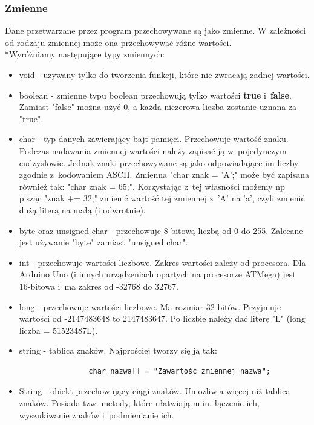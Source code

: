\documentclass[a4paper,12pt, twoside]{article}
\begin{document}
	\subsubsection{Zmienne}
		Dane przetwarzane przez program przechowywane są jako zmienne. W zależności od rodzaju zmiennej może ona przechowywać różne wartości.
		\\*Wyróżniamy następujące typy zmiennych:
		\begin{itemize}
			\item void - używany tylko do tworzenia funkcji, które nie zwracają żadnej wartości.
			\item boolean - zmienne typu boolean przechowują tylko wartości \textbf{true} i~\textbf{false}. Zamiast "false" można użyć $0$, a każda niezerowa liczba zostanie uznana za "true".
			\item char - typ danych zawierający bajt pamięci. Przechowuje wartość znaku.
				Podczas nadawania zmiennej wartości należy zapisać ją w~pojedynczym cudzysłowie.
				Jednak znaki przechowywane są jako odpowiadające im liczby zgodnie z~kodowaniem ASCII.
				Zmienna "char znak = 'A';" może być zapisana również tak: "char znak = 65;".
				Korzystając z~tej własności możemy np pisząc "znak += 32;" zmienić wartość tej zmiennej z~'A' na 'a', czyli zmienić dużą literą na małą (i odwrotnie).
			\item byte oraz unsigned char - przechowuje 8 bitową liczbą od 0 do 255. Zalecane jest używanie "byte" zamiast "unsigned char".
			\item int - przechowuje wartości liczbowe. Zakres wartości zależy od procesora.
				Dla Arduino Uno (i innych urządzeniach opartych na procesorze ATMega) jest 16-bitowa i~ma zakres od -32768 do 32767.
			\item long - przechowuje wartości liczbowe. Ma rozmiar 32 bitów. Przyjmuje wartości od -2147483648 to 2147483647. Po liczbie należy dać literę "L" (long liczba = 51523487L).
			\item string - tablica znaków. Najprościej tworzy się ją tak:
				\begin{verbatim}
				char nazwa[] = "Zawartość zmiennej nazwa";
				\end{verbatim}
			\item String - obiekt przechowujący ciągi znaków. Umożliwia więcej niż tablica znaków. Posiada tzw. metody, które ułatwiają m.in. łączenie ich, wyszukiwanie znaków i~podmienianie ich.
		\end{itemize}
	
\end{document}
